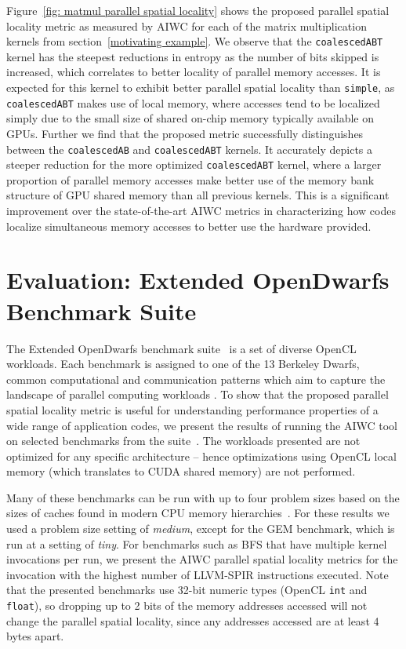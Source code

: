 \documentclass[review=false, sigchi]{acmart}
\begin{document}
	Figure~\ref{fig: matmul parallel spatial locality} shows the proposed parallel spatial locality metric as measured by AIWC for each of the matrix multiplication kernels from section~\ref{motivating example}.
	We observe that the \texttt{coalescedABT} kernel has the steepest reductions in entropy as the number of bits skipped is increased, which correlates to better locality of parallel memory accesses.
	It is expected for this kernel to exhibit better parallel spatial locality than \texttt{simple}, as \texttt{coalescedABT} makes use of local memory, where accesses tend to be localized simply due to the small size of shared on-chip memory typically available on GPUs.
	Further we find that the proposed metric successfully distinguishes between the \texttt{coalescedAB} and \texttt{coalescedABT} kernels.
	It accurately depicts a steeper reduction for the more optimized \texttt{coalescedABT} kernel, where a larger proportion of parallel memory accesses make better use of the memory bank structure of GPU shared memory than all previous kernels.
	This is a significant improvement over the state-of-the-art AIWC metrics in characterizing how codes localize simultaneous memory accesses to better use the hardware provided.
	
	\section{Evaluation: Extended OpenDwarfs Benchmark Suite} \label{results}
	
	The Extended OpenDwarfs benchmark suite~\cite{johnston18opendwarfs, krommydas2016opendwarfs} is a set of diverse OpenCL workloads.
	Each benchmark is assigned to one of the 13 Berkeley Dwarfs, common computational and communication patterns which aim to capture the landscape of parallel computing workloads \cite{asanovic2006landscape}. 
	To show that the proposed parallel spatial locality metric is useful for understanding performance properties of a wide range of application codes, we present the results of running the AIWC tool on selected benchmarks from the suite~\cite{opendwarfs2020head}.
	The workloads presented are not optimized for any specific architecture -- hence optimizations using OpenCL local memory (which translates to CUDA shared memory) are not performed. 
	
	Many of these benchmarks can be run with up to four problem sizes based on the sizes of caches found in modern CPU memory hierarchies~\cite{johnston18opendwarfs}.
	For these results we used a problem size setting of \emph{medium}, except for the GEM benchmark, which is run at a setting of \emph{tiny}.
	For benchmarks such as BFS that have multiple kernel invocations per run, we present the AIWC parallel spatial locality metrics for the invocation with the highest number of LLVM-SPIR instructions executed.
	Note that the presented benchmarks use 32-bit numeric types (OpenCL \texttt{int} and \texttt{float}), so dropping up to 2 bits of the memory addresses accessed will not change the parallel spatial locality, since any addresses accessed are at least 4 bytes apart.
	
\end{document}
